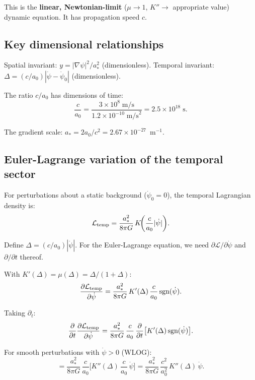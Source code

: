 \documentclass[11pt]{article}
\newcommand{\ee}[1]{\times 10^{#1}}
\begin{document}
This is the \textbf{linear, Newtonian-limit} ($\mu \to 1$, $K'' \to$
appropriate value) dynamic equation. It has propagation speed $c$.

\subsection{Key dimensional relationships}

Spatial invariant: $y = |\nabla\psi|^2/a_*^2$ (dimensionless).
Temporal invariant: $\Delta = (c/a_0)|\dot\psi - \dot\psi_0|$ (dimensionless).

The ratio $c/a_0$ has dimensions of time:
\begin{equation}
\frac{c}{a_0} = \frac{3\ee{8}\;\text{m/s}}{1.2\ee{-10}\;\text{m/s}^2}
= 2.5\ee{18}\;\text{s}.
\end{equation}

The gradient scale: $a_* = 2a_0/c^2 = 2.67\ee{-27}$~m$^{-1}$.

\subsection{Euler-Lagrange variation of the temporal sector}

For perturbations about a static background ($\dot\psi_0 = 0$),
the temporal Lagrangian density is:
\begin{equation}
\mathcal{L}_{\rm temp} = \frac{a_*^2}{8\pi G}\,K\!\biggl(\frac{c}{a_0}|\dot\psi|\biggr).
\end{equation}

Define $\Delta = (c/a_0)|\dot\psi|$. For the Euler-Lagrange equation,
we need $\partial\mathcal{L}/\partial\dot\psi$ and
$\partial/\partial t$ thereof.

With $K'(\Delta) = \mu(\Delta) = \Delta/(1+\Delta)$:
\begin{equation}
\frac{\partial\mathcal{L}_{\rm temp}}{\partial\dot\psi}
= \frac{a_*^2}{8\pi G}\,K'(\Delta)\,\frac{c}{a_0}\,\text{sgn}(\dot\psi).
\end{equation}

Taking $\partial_t$:
\begin{equation}
\frac{\partial}{\partial t}\frac{\partial\mathcal{L}_{\rm temp}}{\partial\dot\psi}
= \frac{a_*^2}{8\pi G}\,\frac{c}{a_0}\,\frac{\partial}{\partial t}
\bigl[K'(\Delta)\,\text{sgn}(\dot\psi)\bigr].
\end{equation}

For smooth perturbations with $\dot\psi > 0$ (WLOG):
\begin{equation}
= \frac{a_*^2}{8\pi G}\,\frac{c}{a_0}\biggl[
  K''(\Delta)\,\frac{c}{a_0}\,\ddot\psi
\biggr]
= \frac{a_*^2}{8\pi G}\,\frac{c^2}{a_0^2}\,K''(\Delta)\,\ddot\psi.
\end{equation}
\end{document}
